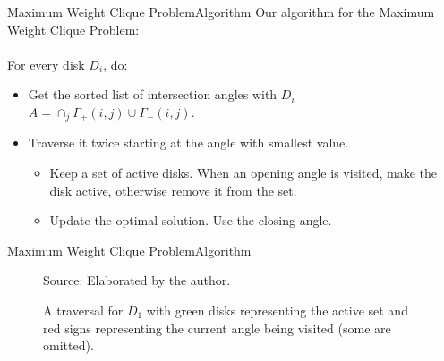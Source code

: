 \documentclass{beamer}
\newcommand{\source}[1]{\caption*{Source: {#1}} }
\begin{document}
\begin{frame}{Maximum Weight Clique Problem}{Algorithm}
	Our algorithm for the Maximum Weight Clique Problem:\\~\\
	
	For every disk $D_i$, do:
	\begin{itemize}
		\item Get the sorted list of intersection angles with $D_i$
				$A=\cap_{j}\Gamma_+(i,j) \cup \Gamma_-(i,j)$.
		\item Traverse it twice starting at the angle with smallest value.
		\begin{itemize}
			\item Keep a set of active disks. When an opening angle is visited, make the disk active, otherwise remove it from the set.
			\item Update the optimal solution. Use the closing angle.
		\end{itemize}
	\end{itemize}
\end{frame}


	
%	

\begin{frame}{Maximum Weight Clique Problem}{Algorithm}

	\begin{figure}
		\caption{A traversal for $D_1$ with green disks representing the active set and red signs representing the current angle being visited (some are omitted).}
		
			\source{Elaborated by the author.}
	\end{figure}
\end{frame}
\end{document}
